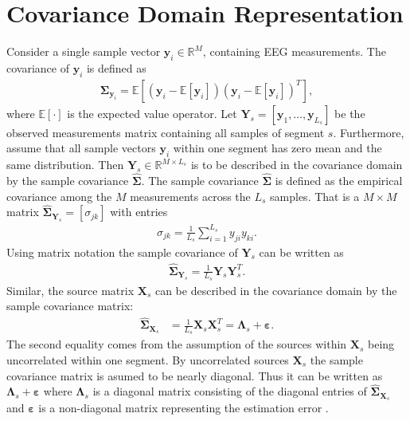 \section{Covariance Domain Representation}\label{sec:cov}
Consider a single sample vector $\textbf{y}_i\in \mathbb{R}^{M}$, containing EEG measurements. 
The covariance of $\textbf{y}_i$ is defined as
\begin{align*}
\boldsymbol{\Sigma}_{\textbf{y}_i}=\mathbb{E}[(\textbf{y}_i-\mathbb{E}[\textbf{y}_i])(\textbf{y}_i-\mathbb{E}[\textbf{y}_i])^T],
\end{align*}
where $\mathbb{E}[\cdot]$ is the expected value operator. 
Let $\textbf{Y}_{s}=\left[\textbf{y}_1, \hdots ,\textbf{y}_{L_s}\right]$ be the observed measurements matrix containing all samples of segment $s$.
Furthermore, assume that all sample vectors $\textbf{y}_i$ within one segment has zero mean and the same distribution.  
Then $\mathbf{Y}_s \in \mathbb{R}^{M \times L_s}$ is to be described in the covariance domain by the sample covariance $\widehat{\boldsymbol{\Sigma}}$. The sample covariance $\widehat{\boldsymbol{\Sigma}}$ is defined as the empirical covariance among the $M$ measurements across the $L_s$ samples. That is a $M \times M$ matrix $\widehat{\boldsymbol{\Sigma}}_{\mathbf{Y}_s} = [\sigma_{jk}]$ with entries 
\begin{align*}
\sigma_{jk}= \frac{1}{L_s}\sum_{i=1}^{L_s} y_{ji} y_{ki}.
\end{align*}
Using matrix notation the sample covariance of $\mathbf{Y}_s$ can be written as
\begin{align*}
\widehat{\boldsymbol{\Sigma}}_{\mathbf{Y}_s} = \frac{1}{L_s} \mathbf{Y}_s \mathbf{Y}_s^T.
\end{align*} 
Similar, the source matrix $\mathbf{X}_s$ can be described in the covariance domain by the sample covariance matrix:
\begin{align*}
\widehat{\boldsymbol{\Sigma}}_{\mathbf{X}_s} &= \frac{1}{L_s} \mathbf{X}_s \mathbf{X}_s^T = \boldsymbol{\Lambda}_s + \boldsymbol{\varepsilon}. 
\end{align*}
The second equality comes from the assumption of the sources within $\mathbf{X}_s$ being uncorrelated within one segment. By uncorrelated sources $\mathbf{X}_s$ the sample covariance matrix is asumed to be nearly diagonal. Thus it can be written as $\boldsymbol{\Lambda}_s + \boldsymbol{\varepsilon}$ where $\boldsymbol{\Lambda}_s$ is a diagonal matrix consisting of the diagonal entries of $\widehat{\boldsymbol{\Sigma}}_{\mathbf{X}_s}$ and $ \boldsymbol{\varepsilon}$ is a non-diagonal matrix representing the estimation error \cite{Balkan2015}.

